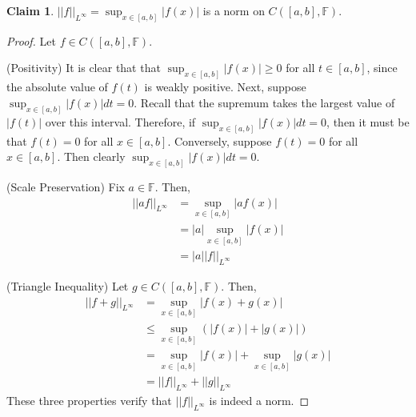 \documentclass[letterpaper,12pt]{article}
\theoremstyle{definition}
\newtheorem{claim}[theorem]{Claim}
\begin{document}
\begin{claim}
	$||f||_{L^{\infty}} = \sup_{x \in [a,b]} |f(x)|$  is a norm on $C([a,b],\mathbb{F})$.
\end{claim}
\begin{proof}
	Let $f \in C([a,b],\mathbb{F})$.
	
	(Positivity) It is clear that that $\sup_{x \in [a,b]} |f(x)| \geq 0$ for all $t \in [a,b]$, since the absolute value of $f(t)$ is weakly positive. Next, suppose $\sup_{x \in [a,b]} |f(x)| dt = 0$. Recall that the supremum takes the largest value of $|f(t)|$ over this interval. Therefore, if $\sup_{x \in [a,b]} |f(x)| dt = 0$, then it must be that $f(t) = 0$ for all $x \in [a,b]$. Conversely, suppose $f(t) = 0$ for all $x \in [a,b]$. Then clearly $\sup_{x \in [a,b]} |f(x)| dt = 0$.
	
	(Scale Preservation)  Fix $a \in \mathbb{F}$. Then,
	\begin{align*}
	||af||_{L^{\infty}} &= \sup_{x \in [a,b]} |a f(x)| \\
					&= |a| \sup_{x \in [a,b]} |f(x)| \\
					&= |a| |f||_{L^{\infty}}
	\end{align*}
	
	(Triangle Inequality) Let $g \in C([a,b],\mathbb{F})$. Then,
	\begin{align*}
		||f + g||_{L^{\infty}} &= \sup_{x \in [a,b]} |f(x) + g(x)| \\
		&\leq  \sup_{x \in [a,b]} (|f(x)| +|g(x)|) \\
		&= \sup_{x \in [a,b]} |f(x)| +  \sup_{x \in [a,b]} |g(x)|   \\
		&=||f||_{L^{\infty}} + ||g||_{L^{\infty}}
	\end{align*}
	These three properties verify that $||f||_{L^{\infty}}$ is indeed a norm.
\end{proof}
\end{document}
